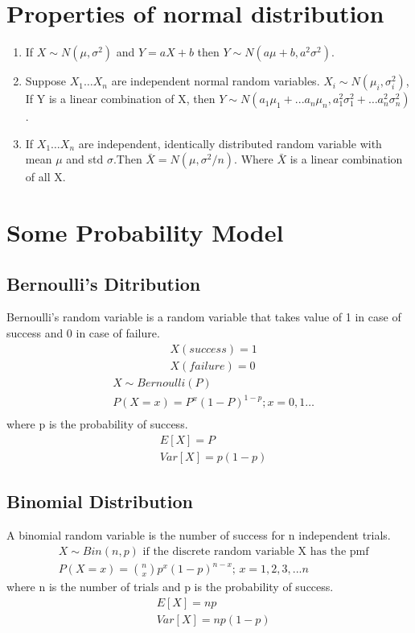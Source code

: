 \documentclass{article}
\begin{document}
    \section*{Properties of normal distribution}
    \begin{enumerate}
        \item If $X\sim N(\mu, \sigma^{2})$ and $Y = aX+b$ then $Y\sim N(a\mu+b, a^{2}\sigma^{2})$.
        \item Suppose $X_{1} \dots X_{n}$ are independent normal random variables. $X_{i} \sim N(\mu_{i}, \sigma_{i}^{2})$, 
                    If Y is a linear combination of X, then $Y\sim N(a_{1}\mu_{1}+...a_{n}\mu_{n}, a_{1}^{2}\sigma_{1}^{2}+\dots a_{n}^{2}\sigma_{n}^{2})$.
            \item If $X_{1} \dots X_{n}$  are independent, identically distributed random variable with mean $\mu$ and std $\sigma$.Then 
                    $\bar{X} = N(\mu, \sigma^{2} / n)$. Where $\bar{X}$ is a linear combination of all X.
    \end{enumerate}

    \section*{Some Probability Model}
    \subsection*{Bernoulli's Ditribution}
        Bernoulli's random variable is a random variable that takes value of 1 in case of success and 0 in case of failure.
        \begin{align*}
            &X(success) = 1\\
            &X(failure) = 0
        \end{align*}
        \begin{align*}
           &X\sim Bernoulli(P) \\
           &P(X = x) = P^{x}(1-P)^{1-p}; x = 0, 1 \dots\\
        \end{align*}
        where p is the probability of success.
        \begin{align*}
            &E[X] = P\\
            &Var[X] = p(1-p)
        \end{align*}
        

        
    \subsection*{Binomial Distribution}
    A binomial random variable is the number of success for n independent trials.
    \begin{align*}
        &X\sim Bin(n, p) \text{ if the discrete random variable X has the pmf}\\
        &P(X=x) = {n \choose x} p^{x}(1-p)^{n-x};\, x = 1, 2, 3,...n
    \end{align*}
    where n is the number of trials and p is the probability of success.
    \begin{align*}
        &E[X] = np\\
        &Var[X] = np(1-p)
    \end{align*}
\end{document}
